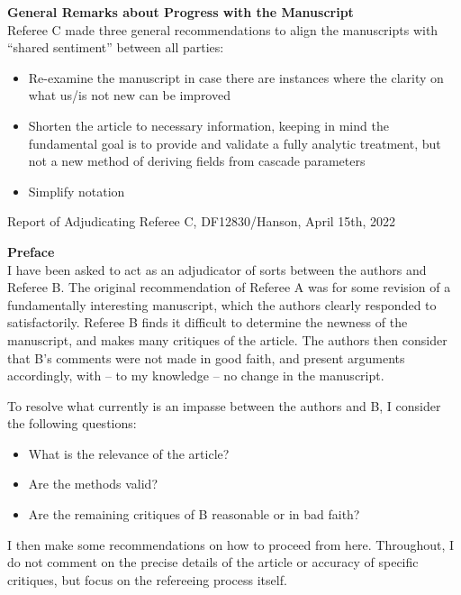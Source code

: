 \documentclass[12pt]{article}
\begin{document}
\textbf{General Remarks about Progress with the Manuscript} \\

Referee C made three general recommendations to align the manuscripts with ``shared sentiment'' between all parties:

\begin{itemize}
\item Re-examine the manuscript in case there are instances where the clarity on what
us/is not new can be improved
\item Shorten the article to necessary information, keeping in mind the fundamental goal
is to provide and validate a fully analytic treatment, but not a new method of
deriving fields from cascade parameters
\item Simplify notation
\end{itemize}

Report of Adjudicating Referee C, DF12830/Hanson, April 15th, 2022 \\ \vspace{0.25cm}
\hrulefill

\textbf{Preface} \\ 

I have been asked to act as an adjudicator of sorts between the authors and Referee B. The
original recommendation of Referee A was for some revision of a fundamentally interesting
manuscript, which the authors clearly responded to satisfactorily. Referee B finds it difficult
to determine the newness of the manuscript, and makes many critiques of the article. The
authors then consider that B’s comments were not made in good faith, and present
arguments accordingly, with – to my knowledge – no change in the manuscript.

To resolve what currently is an impasse between the authors and B, I consider the following
questions:

\begin{itemize}
\item What is the relevance of the article?
\item Are the methods valid?
\item Are the remaining critiques of B reasonable or in bad faith?
\end{itemize}

I then make some recommendations on how to proceed from here. Throughout, I do not comment on the precise details of the article or accuracy of specific critiques, but focus on the refereeing process itself. \\
\end{document}
